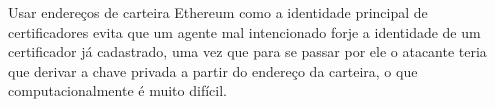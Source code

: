 \documentclass[a4paper,11pt]{article}
\begin{document}
Usar endereços de carteira Ethereum como a identidade principal de certificadores evita que um agente mal intencionado forje a identidade de um certificador já cadastrado, uma vez que para se passar por ele o atacante teria que derivar a chave privada a partir do endereço da carteira, o que computacionalmente é muito difícil.

\end{document}
